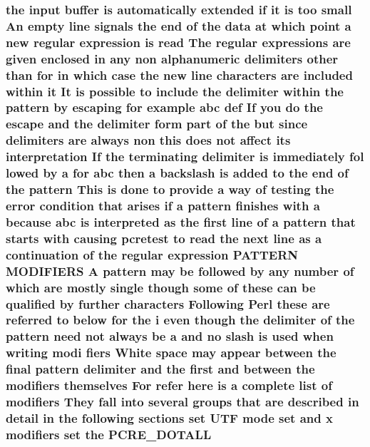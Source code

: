 \subsubsection[{\texorpdfstring{P\+C\+R\+E\+\_\+\+D\+O\+T\+A\+LL}{PCRE_DOTALL}}]{\setlength{\rightskip}{0pt plus 5cm}the {\bf input} {\bf buffer} {\bf is} automatically extended {\bf if} {\bf it} {\bf is} too small An {\bf empty} {\bf line} signals the {\bf end} {\bf of} the {\bf data} at {\bf which} {\bf point} {\bf a} new regular {\bf expression} {\bf is} {\bf read} The regular {\bf expressions} {\bf are} {\bf given} enclosed {\bf in} {\bf any} non {\bf alphanumeric} delimiters other {\bf than} for {\bf in} {\bf which} {\bf case} the new {\bf line} {\bf characters} {\bf are} {\bf included} within {\bf it} It {\bf is} {\bf possible} {\bf to} {\bf include} the delimiter within the {\bf pattern} by escaping for {\bf example} {\bf abc} def If you {\bf do} the escape and the delimiter form part {\bf of} the but since delimiters {\bf are} always non {\bf this} does {\bf not} affect its interpretation If the terminating delimiter {\bf is} immediately fol lowed by {\bf a} for {\bf abc} then {\bf a} {\bf backslash} {\bf is} added {\bf to} the {\bf end} {\bf of} the {\bf pattern} This {\bf is} {\bf done} {\bf to} provide {\bf a} {\bf way} {\bf of} testing the {\bf error} condition that {\bf arises} {\bf if} {\bf a} {\bf pattern} finishes {\bf with} {\bf a} because {\bf abc} {\bf is} interpreted {\bf as} the {\bf first} {\bf line} {\bf of} {\bf a} {\bf pattern} that starts {\bf with} causing {\bf pcretest} {\bf to} {\bf read} the next {\bf line} {\bf as} {\bf a} continuation {\bf of} the regular {\bf expression} P\+A\+T\+T\+E\+RN M\+O\+D\+I\+F\+I\+E\+RS {\bf A} {\bf pattern} may {\bf be} followed by {\bf any} {\bf number} {\bf of} {\bf which} {\bf are} mostly single {\bf though} some {\bf of} these {\bf can} {\bf be} qualified by further {\bf characters} Following {\bf Perl} these {\bf are} referred {\bf to} {\bf below} for the {\bf i} even {\bf though} the delimiter {\bf of} the {\bf pattern} need {\bf not} always {\bf be} {\bf a} and no {\bf slash} {\bf is} {\bf used} when writing modi fiers White {\bf space} may appear between the final {\bf pattern} delimiter and the {\bf first} and between the {\bf modifiers} {\bf themselves} For refer {\bf here} {\bf is} {\bf a} complete {\bf list} {\bf of} {\bf modifiers} They fall into several groups that {\bf are} described {\bf in} detail {\bf in} the following sections {\bf set} U\+TF {\bf mode} {\bf set} and {\bf x} {\bf modifiers} {\bf set} the P\+C\+R\+E\+\_\+\+D\+O\+T\+A\+LL}\hypertarget{pcretest_8txt_abdfb17946dde0544aade3b2b3c333e3e}{}\label{pcretest_8txt_abdfb17946dde0544aade3b2b3c333e3e}
